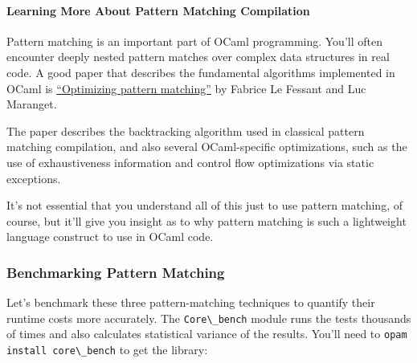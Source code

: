\hypertarget{learning-more-about-pattern-matching-compilation}{%
\paragraph{Learning More About Pattern Matching
Compilation}\label{learning-more-about-pattern-matching-compilation}}

Pattern matching is an important part of OCaml programming. You'll often
encounter deeply nested pattern matches over complex data structures in
real code. A good paper that describes the fundamental algorithms
implemented in OCaml is
\href{http://dl.acm.org/citation.cfm?id=507641}{``Optimizing pattern
matching''} by Fabrice Le Fessant and Luc Maranget.

The paper describes the backtracking algorithm used in classical pattern
matching compilation, and also several OCaml-specific optimizations,
such as the use of exhaustiveness information and control flow
optimizations via static exceptions.

It's not essential that you understand all of this just to use pattern
matching, of course, but it'll give you insight as to why pattern
matching is such a lightweight language construct to use in OCaml code.

\hypertarget{benchmarking-pattern-matching}{%
\subsubsection{Benchmarking Pattern
Matching}\label{benchmarking-pattern-matching}}

Let's benchmark these three pattern-matching techniques to quantify
their runtime costs more accurately. The
\passthrough{\lstinline!Core\_bench!} module runs the tests thousands of
times and also calculates statistical variance of the results. You'll
need to \passthrough{\lstinline!opam install core\_bench!} to get the
library:

